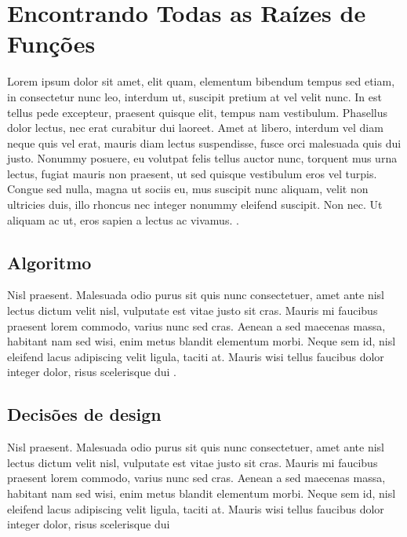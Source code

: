 
\chapter{Encontrando Todas as Raízes de Funções}\label{partes:allRootsFunction}

  Lorem ipsum dolor sit amet, elit quam, elementum bibendum tempus sed etiam, in consectetur nunc leo, interdum ut, suscipit pretium at vel velit nunc. In est tellus pede excepteur, praesent quisque elit, tempus nam vestibulum. Phasellus dolor lectus, nec erat curabitur dui laoreet. Amet at libero, interdum vel diam neque quis vel erat, mauris diam lectus suspendisse, fusce orci malesuada quis dui justo. Nonummy posuere, eu volutpat felis tellus auctor nunc, torquent mus urna lectus, fugiat mauris non praesent, ut sed quisque vestibulum eros vel turpis. Congue sed nulla, magna ut sociis eu, mus suscipit nunc aliquam, velit non ultricies duis, illo rhoncus nec integer nonummy eleifend suscipit. Non nec. Ut aliquam ac ut, eros sapien a lectus ac vivamus. \citet{einstein}.

  \section{Algoritmo}
  \label{sec:alg}

    Nisl praesent. Malesuada odio purus sit quis nunc consectetuer, amet ante nisl lectus dictum velit nisl, vulputate est vitae justo sit cras. Mauris mi faucibus praesent lorem commodo, varius nunc sed cras. Aenean a sed maecenas massa, habitant nam sed wisi, enim metus blandit elementum morbi. Neque sem id, nisl eleifend lacus adipiscing velit ligula, taciti at. Mauris wisi tellus faucibus dolor integer dolor, risus scelerisque dui \citet*{latexcompanion}.

  \section{Decisões de design}
  \label{sec:design}

    Nisl praesent. Malesuada odio purus sit quis nunc consectetuer, amet ante nisl lectus dictum velit nisl, vulputate est vitae justo sit cras. Mauris mi faucibus praesent lorem commodo, varius nunc sed cras. Aenean a sed maecenas massa, habitant nam sed wisi, enim metus blandit elementum morbi. Neque sem id, nisl eleifend lacus adipiscing velit ligula, taciti at. Mauris wisi tellus faucibus dolor integer dolor, risus scelerisque dui
  

